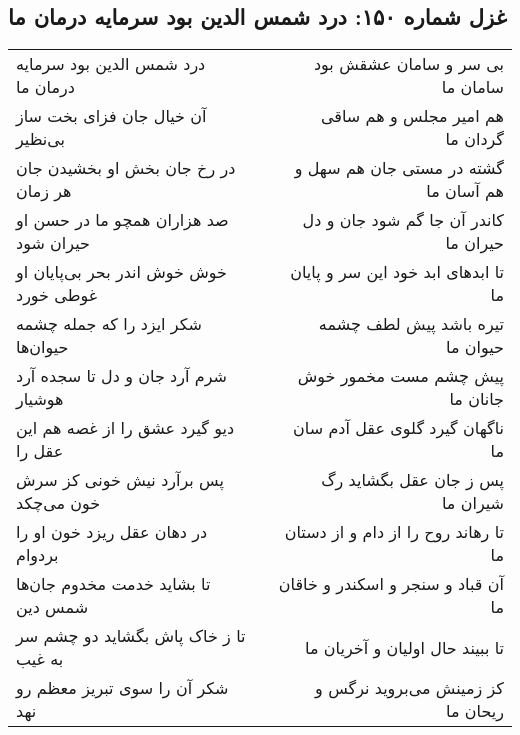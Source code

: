 \begin{center}
\section*{غزل شماره ۱۵۰: درد شمس الدین بود سرمایه درمان ما}
\label{sec:0150}
\begin{longtable}{l p{0.5cm} r}
درد شمس الدین بود سرمایه درمان ما
&&
بی سر و سامان عشقش بود سامان ما
\\
آن خیال جان فزای بخت ساز بی‌نظیر
&&
هم امیر مجلس و هم ساقی گردان ما
\\
در رخ جان بخش او بخشیدن جان هر زمان
&&
گشته در مستی جان هم سهل و هم آسان ما
\\
صد هزاران همچو ما در حسن او حیران شود
&&
کاندر آن جا گم شود جان و دل حیران ما
\\
خوش خوش اندر بحر بی‌پایان او غوطی خورد
&&
تا ابدهای ابد خود این سر و پایان ما
\\
شکر ایزد را که جمله چشمه حیوان‌ها
&&
تیره باشد پیش لطف چشمه حیوان ما
\\
شرم آرد جان و دل تا سجده آرد هوشیار
&&
پیش چشم مست مخمور خوش جانان ما
\\
دیو گیرد عشق را از غصه هم این عقل را
&&
ناگهان گیرد گلوی عقل آدم سان ما
\\
پس برآرد نیش خونی کز سرش خون می‌چکد
&&
پس ز جان عقل بگشاید رگ شیران ما
\\
در دهان عقل ریزد خون او را بردوام
&&
تا رهاند روح را از دام و از دستان ما
\\
تا بشاید خدمت مخدوم جان‌ها شمس دین
&&
آن قباد و سنجر و اسکندر و خاقان ما
\\
تا ز خاک پاش بگشاید دو چشم سر به غیب
&&
تا ببیند حال اولیان و آخریان ما
\\
شکر آن را سوی تبریز معظم رو نهد
&&
کز زمینش می‌بروید نرگس و ریحان ما
\\
\end{longtable}
\end{center}
